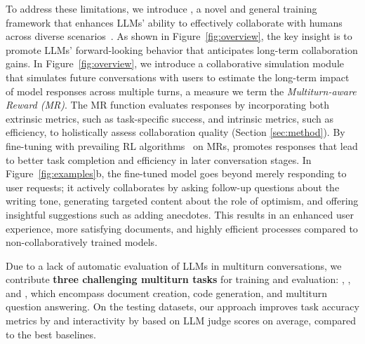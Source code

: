 To address these limitations, we introduce {\bf \name{}}, a novel and general training framework that enhances LLMs' ability to effectively collaborate with humans across diverse scenarios~\citep{rethinking_conv_agent, neural_approach, clarify_survey}. 
As shown in Figure~\ref{fig:overview},
the key insight is to promote LLMs' forward-looking behavior that anticipates long-term collaboration gains. 
In Figure~\ref{fig:overview}, we introduce a collaborative simulation module that simulates future conversations with users to estimate the long-term impact of model responses across multiple turns, a measure we term the \textit{Multiturn-aware Reward (MR)}. The MR function evaluates responses by incorporating both extrinsic metrics, such as task-specific success, and intrinsic metrics, such as efficiency, to holistically assess collaboration quality (\cf Section \ref{sec:method}).
By fine-tuning with prevailing RL algorithms~\citep{dpo, ppo} on MRs, \name{} promotes responses that lead to better task completion and efficiency in later conversation stages.
In Figure~\ref{fig:examples}b, the fine-tuned model goes beyond merely responding to user requests; it actively collaborates by asking follow-up questions about the writing tone, generating targeted content about the role of optimism, and offering insightful suggestions such as adding anecdotes. This results in an enhanced user experience, more satisfying documents, and highly efficient processes compared to non-collaboratively trained models.


Due to a lack of automatic evaluation of LLMs in multiturn conversations, we contribute \textbf{three challenging multiturn tasks} for training and evaluation: \doct, \codet, and \mathct, which encompass document creation, code generation, and multiturn question answering. On the testing datasets, our approach improves task accuracy metrics by \taskimprov and interactivity by \itrimprov based on LLM judge scores on average, compared to the best baselines.



